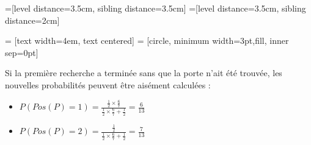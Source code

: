 \documentclass[a4paper,12pt]{article}
\begin{document}
=[level distance=3.5cm, sibling distance=3.5cm]
=[level distance=3.5cm, sibling distance=2cm]

 = [text width=4em, text centered]
 = [circle, minimum width=3pt,fill, inner sep=0pt]
\begin{center}
\end{center}

Si la première recherche a terminée sans que la porte n'ait été trouvée, les
nouvelles probabilités peuvent être aisément calculées :
\begin{itemize}
\item $P(Pos(P) = 1) = \frac{\frac{1}{2} \times \frac{6}{7}}
                            {\frac{1}{2} \times \frac{6}{7} +
                             \frac{1}{2}}
                     = \frac{6}{13}$
\item $P(Pos(P) = 2) = \frac{\frac{1}{2}}
                            {\frac{1}{2} \times \frac{6}{7} +
                             \frac{1}{2}}
                     = \frac{7}{13}$
\end{itemize}
\end{document}
